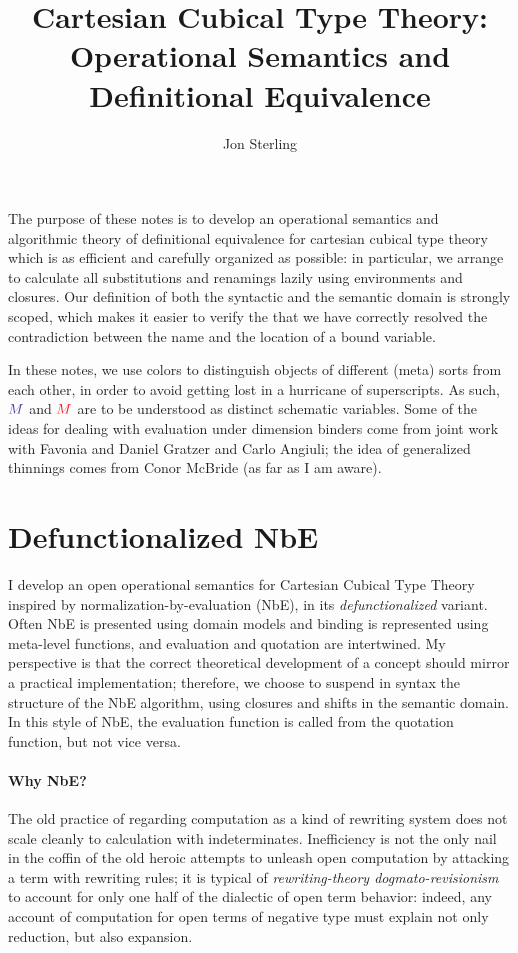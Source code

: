\documentclass{article}
\title{Cartesian Cubical Type Theory:\\ Operational Semantics and
  Definitional Equivalence} \author{Jon Sterling}
\newcommand\FmtTm[1]{{\color{Violet}#1}}
\newcommand\FmtVal[1]{{\color{Red}{#1}}}
\begin{document}
\maketitle

The purpose of these notes is to develop an operational semantics and
algorithmic theory of definitional equivalence for cartesian cubical
type theory which is as efficient and carefully organized as possible:
in particular, we arrange to calculate all substitutions and renamings
lazily using environments and closures. Our definition of both the
syntactic and the semantic domain is strongly scoped, which makes it
easier to verify the that we have correctly resolved the contradiction
between the name and the location of a bound variable.

In these notes, we use colors to distinguish objects of different
(meta) sorts from each other, in order to avoid getting lost in a
hurricane of superscripts. As such, $\FmtTm{M}$ and $\FmtVal{M}$ are
to be understood as distinct schematic variables. Some of the ideas
for dealing with evaluation under dimension binders come from joint
work with Favonia and Daniel Gratzer and Carlo Angiuli; the idea of
generalized thinnings comes from Conor McBride (as far as I am aware).

\section{Defunctionalized NbE}

I develop an open operational semantics for Cartesian Cubical Type
Theory inspired by normalization-by-evaluation (NbE), in its
\emph{defunctionalized} variant. Often NbE is presented using domain
models and binding is represented using meta-level functions, and
evaluation and quotation are intertwined. My perspective is that the
correct theoretical development of a concept should mirror a practical
implementation; therefore, we choose to suspend in syntax the
structure of the NbE algorithm, using closures and shifts in the
semantic domain. In this style of NbE, the evaluation function is
called from the quotation function, but not vice versa.

\paragraph{Why NbE?}

The old practice of regarding computation as a kind of rewriting
system does not scale cleanly to calculation with
indeterminates. Inefficiency is not the only nail in the coffin of the
old heroic attempts to unleash open computation by attacking a term
with rewriting rules; it is typical of \emph{rewriting-theory
  dogmato-revisionism} to account for only one half of the dialectic
of open term behavior: indeed, any account of computation for open
terms of negative type must explain not only reduction, but also
expansion.
\end{document}
